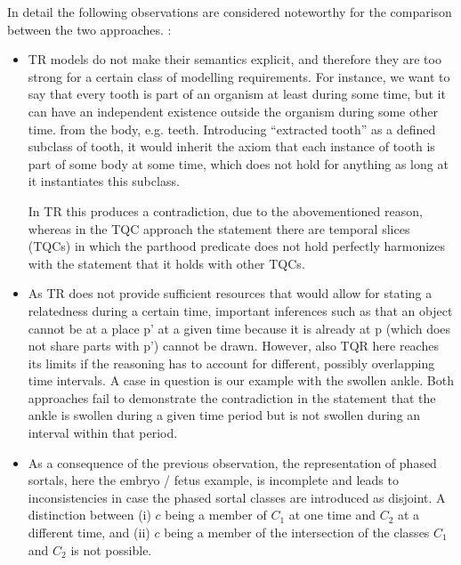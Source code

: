 In detail the following observations are considered noteworthy for the comparison between the two approaches. :

\begin{itemize}
\item
TR models do not make their semantics explicit, and therefore they are too strong for a certain class of
modelling requirements. 
For instance, we want to say that every tooth is part of an organism at least during some time,
but it can have an independent existence outside the organism during some other time. 
from the body, e.g. teeth. Introducing ``extracted tooth'' as a defined subclass of tooth, it would inherit the axiom that each 
instance of tooth is part of some body at some time, which does not hold for anything as long at it instantiates this subclass.   



In TR this produces a contradiction, due to the abovementioned reason, whereas 
in the TQC approach the statement there are temporal slices (TQCs) in which the parthood predicate does not hold perfectly   
harmonizes with the statement that it holds with other TQCs.

\item
As TR does not provide sufficient resources that would allow for stating a relatedness during a 
certain time, important inferences such as that an object cannot be at a place p' at a given time 
because it is already at p (which does not share parts with p') cannot be drawn. However, also TQR here
reaches its limits if the reasoning has to account for different, possibly overlapping time intervals. 
A case in question is our example with the swollen ankle. Both approaches fail to demonstrate the contradiction 
in the statement that the ankle is swollen during a given time period but is not swollen during an interval
within that period.  


\item
As a consequence of the previous observation, the representation of phased sortals, here 
the embryo / fetus example, is incomplete and leads to inconsistencies in case the phased sortal classes 
are introduced as disjoint. A distinction between (i) $c$ being a member of $C_1$ at one time and 
$C_2$ at a different time, and (ii) $c$ being a member of the intersection of the classes $C_1$ 
and $C_2$ is not possible.



\end{itemize}

